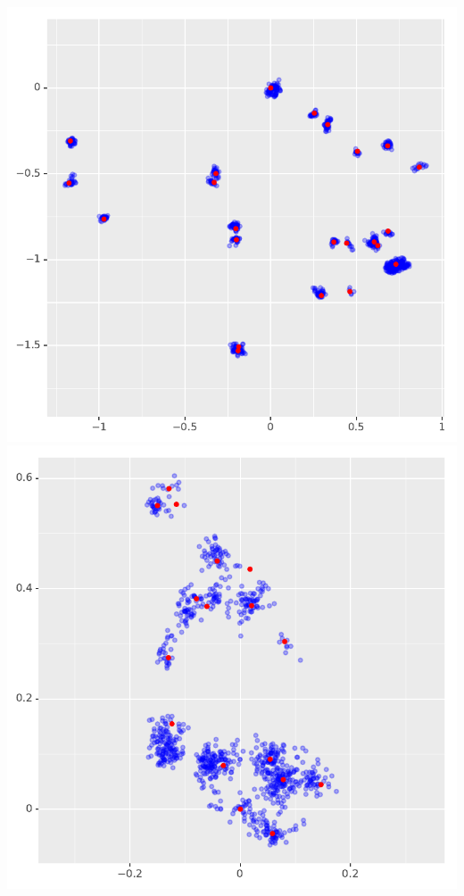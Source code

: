 \documentclass[landscape,footrule]{foils}
\begin{document}
\centerline{
\includegraphics[scale=0.55]{meme_generation_i}
\includegraphics[scale=0.55]{meme_generation_ii}
}
\end{document}
